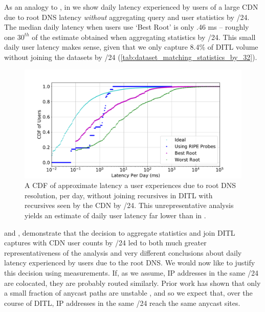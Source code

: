 \documentclass[sigconf,letterpaper,nonacm,10pt,anonymous]{acmart}
\begin{document}
As an analogy to , in
 we show daily latency
experienced by users of a large CDN due to root DNS latency
\emph{without} aggregating query and user statistics by /24. The median
daily latency when users use `Best Root' is only .46 ms -- roughly one
\(30^{th}\) of the estimate obtained when aggregating statistics by /24.
This small daily user latency makes sense, given that we only capture
8.4\% of DITL volume without joining the datasets by /24
(\cref{tab:dataset_matching_statistics_by_32}).

\begin{figure}
    \centering
    \includegraphics[width=\linewidth]{figures/user_root_latency_per_day_by_32.pdf}
    \caption{A CDF of approximate latency a user experiences due to root DNS resolution, per day, without joining recursives in DITL with recursives seen by the CDN by /24. This unrepresentative analysis yields an estimate of daily user latency far lower than in . }
    \label{fig:user_root_latency_per_day_by_32}
\end{figure}

 and
, demonstrate that the
decision to aggregate statistics and join DITL captures with CDN user
counts by /24 led to both much greater representativeness of the
analysis and very different conclusions about daily latency experienced
by users due to the root DNS. We would now like to justify this decision
using measurements. If, as we assume, IP addresses in the same /24 are
colocated, they are probably routed similarly. Prior work has shown that
only a small fraction of anycast paths are unstable \cite{wei2017does},
and so we expect that, over the course of DITL, IP addresses in the same
/24 reach the same anycast sites.
\end{document}
